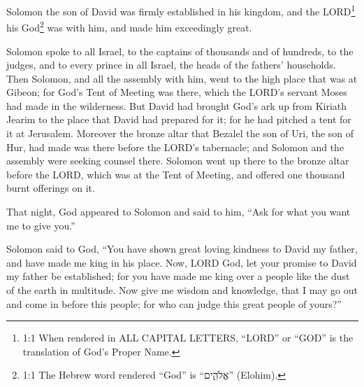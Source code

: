 \newpage
\null
\thispagestyle{empty}
\newpage






\vspace{-1.36in}


\mychapter{} \myverse*{}Solomon the son of David was firmly established in his kingdom,
and the LORD\footnote{1:1 When rendered in ALL CAPITAL LETTERS, “LORD” or “GOD” is the translation of God’s Proper Name.}
his God\footnote{1:1 The Hebrew word rendered “God” is “אֱלֹהִ֑ים” (Elohim).} was with him, and made
him exceedingly great.

\myverse{}Solomon spoke to all Israel, to the captains of thousands and of
hundreds, to the judges, and to every prince in all Israel, the heads of the fathers’ households.
\myverse{}Then Solomon, and all the assembly with him, went to the high place that was
at Gibeon; for God’s Tent of Meeting was there, which the LORD’s servant Moses had made in the wilderness.
\myverse{}But David had brought God’s ark up from Kiriath Jearim to the place that David
had prepared for it; for he had pitched a tent for it at Jerusalem.
\myverse{}Moreover the bronze altar that Bezalel the son of Uri, the son of Hur, had made
was there before the LORD’s tabernacle; and Solomon and the assembly were seeking counsel there.
\myverse{}Solomon went up there to the bronze altar before the LORD, which was at the
Tent of Meeting, and offered one thousand burnt offerings on it.

\myverse{}That night, God appeared to Solomon and said to him, “Ask for what
you want me to give you.”

\myverse{}Solomon said to God, “You have shown great loving kindness to David
my father, and have made me king in his place.
\myverse{}Now, LORD God, let your promise to David my father be established; for you have
made me king over a people like the dust of the earth in multitude.
\myverse{}Now give me wisdom and knowledge, that I may go out and come in before this
people; for who can judge this great people of yours?”

